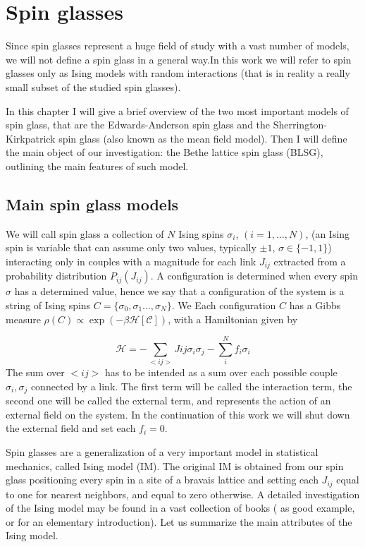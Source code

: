 \chapter{Spin glasses}

Since spin glasses represent a huge field of study with a vast number of models, we will not define a spin glass in a general way.In this work we will refer to spin glasses only as Ising models with random interactions (that is in reality a really small subset of the studied spin glasses). 

In this chapter I will give a brief overview of the two most important models of spin glass, that are the Edwards-Anderson spin glass and the Sherrington-Kirkpatrick spin glass (also known as the mean field model). Then I will define the main object of our investigation: the Bethe lattice spin glass (BLSG), outlining the main features of such model.

\section{Main spin glass models}

We will call spin glass a collection of $N$ Ising spins $\sigma_i$, $(i=1,\dots,N)$, (an Ising spin is variable that can assume only two values, typically $\pm1$, $\sigma \in \{-1,1\}$) interacting only in couples with a magnitude for each link $J_{ij}$ extracted from a probability distribution $P_{ij}(J_{ij})$. A configuration is determined when every spin $\sigma$ has a determined value, hence we say that a configuration of the system is a string of Ising spins $C = \{\sigma_0,\sigma_1 \ldots, \sigma_N\}$. 
We
Each configuration $C$ has a Gibbs measure $\rho(C) \propto \exp(-\beta \mathcal{H[C]})$, with a Hamiltonian given by

\begin{equation}
\mathcal{H} = -\sum_{<ij>} J{ij} \sigma_i \sigma_j - \sum_i^N f_i \sigma_i
\end{equation}
The sum over $<ij>$ has to be intended as a sum over each possible couple $\sigma_i , \sigma_j$ connected by a link. The first term will be called the interaction term, the second one will be called the external term, and represents the action of an external field on the system. In the continuation of this work we will shut down the external field and set each $f_i=0$.

Spin glasses are a generalization of a very important model in statistical mechanics, called Ising model (IM). The original IM is obtained from our spin glass positioning every spin in a site of a bravais lattice and setting each $J_{ij}$ equal to one for nearest neighbors, and equal to zero otherwise.
A detailed investigation of the Ising model may be found in a vast collection of books ( \cite{stat} as good example, or \cite{huang} for an elementary introduction).
Let us summarize the main attributes of the Ising model.

